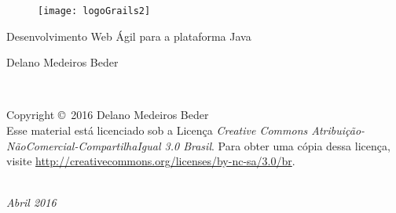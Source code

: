 \documentclass[11pt,fleqn]{book}
\begin{document}
\sloppy

\setcounter{page}{1}



\begingroup
\thispagestyle{empty}
\centering
\vspace*{5cm}
\par\normalfont\fontsize{32}{32}\sffamily\selectfont
\begin{figure}[h]
\centering\texttt{[image: logoGrails2]}
\end{figure}
\vspace{3cm}
Desenvolvimento Web Ágil para a plataforma Java\par %
\vspace*{4cm}
{\Huge 
Delano Medeiros Beder
}\par %

\endgroup


\newpage
~\vfill
\thispagestyle{empty}

\noindent Copyright \copyright\ 2016 Delano Medeiros Beder\\ %

\noindent  Esse material  está licenciado  sob a  Licença {\it  Creative Commons
  Atribuição-NãoComercial-CompartilhaIgual  3.0 Brasil}.  Para  obter uma  cópia
dessa                               licença,                              visite
\url{http://creativecommons.org/licenses/by-nc-sa/3.0/br}. 

\hspace{1cm}\\
\noindent \textit{Abril 2016} %



\pagestyle{empty} %
\end{document}
